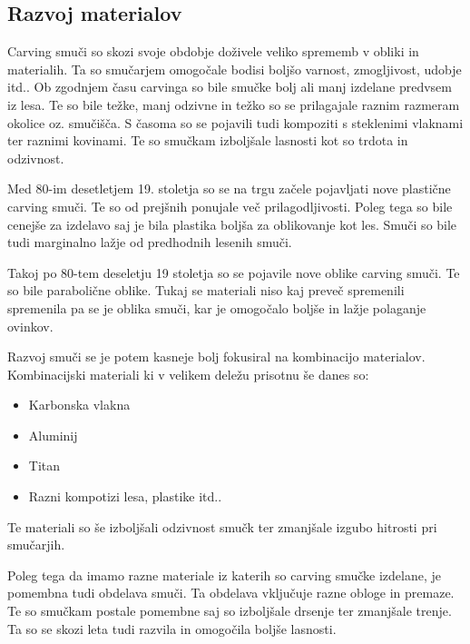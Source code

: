 \documentclass{article}
\begin{document}
\subsection*{Razvoj materialov}
Carving smuči so skozi svoje obdobje doživele veliko sprememb v obliki in materialih.
Ta so smučarjem omogočale bodisi boljšo varnost, zmogljivost, udobje itd..
Ob zgodnjem času carvinga so bile smučke bolj ali manj izdelane predvsem iz lesa.
Te so bile težke, manj odzivne in težko so se prilagajale raznim razmeram okolice oz. smučišča.
S časoma so se pojavili tudi kompoziti s steklenimi vlaknami ter raznimi kovinami.
Te so smučkam izboljšale lasnosti kot so trdota in odzivnost.


Med 80-im desetletjem 19. stoletja so se na trgu začele pojavljati nove plastične carving smuči.
Te so od prejšnih ponujale več prilagodljivosti. Poleg tega so bile cenejše za izdelavo saj je bila plastika boljša za oblikovanje kot les.
Smuči so bile tudi marginalno lažje od predhodnih lesenih smuči.


Takoj po 80-tem deseletju 19 stoletja so se pojavile nove oblike carving smuči. Te so bile parabolične oblike. Tukaj se materiali niso kaj preveč spremenili
spremenila pa se je oblika smuči, kar je omogočalo boljše in lažje polaganje ovinkov.


Razvoj smuči se je potem kasneje bolj fokusiral na kombinacijo materialov.
Kombinacijski materiali ki v velikem deležu prisotnu še danes so: 
\begin{itemize}
    \item Karbonska vlakna
    \item Aluminij
    \item Titan
    \item Razni kompotizi lesa, plastike itd..
\end{itemize}
Te materiali so še izboljšali odzivnost smučk ter zmanjšale izgubo hitrosti pri smučarjih.

\*

Poleg tega da imamo razne materiale iz katerih so carving smučke izdelane, je pomembna tudi obdelava smuči.
Ta obdelava vključuje razne obloge in premaze. Te so smučkam postale pomembne saj so izboljšale drsenje ter zmanjšale trenje. 
Ta so se skozi leta tudi razvila in omogočila boljše lasnosti.
\end{document}
